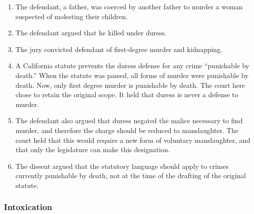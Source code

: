 \begin{enumerate}
    \item The defendant, a father, was coerced by another father to murder a 
    woman suspected of molesting their children.
    \item The defendant argued that he killed under duress.
    \item The jury convicted defendant of first-degree murder and kidnapping.
    \item A California statute prevents the duress defense for any crime 
    ``punishable by death.'' When the statute was passed, all forms of murder 
    were punishable by death. Now, only first degree murder is punishable by 
    death. The court here chose to retain the original scope. It held that 
    duress is never a defense to murder.
    \item The defendant also argued that duress negated the malice necessary 
    to find murder, and therefore the charge should be reduced to 
    manslaughter. The court held that this would require a new form of 
    voluntary manslaughter, and that only the legislature can make this 
    designation.
    \item The dissent argued that the statutory language should apply to 
    crimes currently punishable by death, not at the time of the drafting 
    of the original statute.
\end{enumerate}

\subsubsection{Intoxication}

